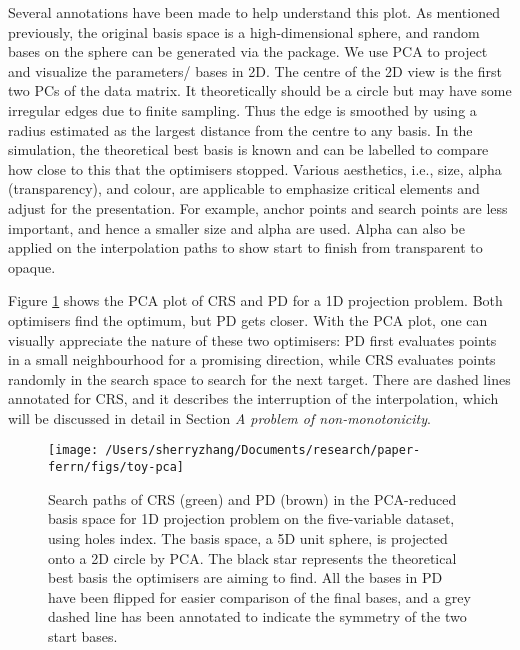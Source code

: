 Several annotations have been made to help understand this plot. As
mentioned previously, the original basis space is a high-dimensional
sphere, and random bases on the sphere can be generated via the
 \citep{geozoo} package. We use PCA to project and
visualize the parameters/ bases in 2D. The centre of the 2D view is the
first two PCs of the data matrix. It theoretically should be a circle
but may have some irregular edges due to finite sampling. Thus the edge
is smoothed by using a radius estimated as the largest distance from the
centre to any basis. In the simulation, the theoretical best basis is
known and can be labelled to compare how close to this that the
optimisers stopped. Various aesthetics, i.e., size, alpha
(transparency), and colour, are applicable to emphasize critical
elements and adjust for the presentation. For example, anchor points and
search points are less important, and hence a smaller size and alpha are
used. Alpha can also be applied on the interpolation paths to show start
to finish from transparent to opaque.

Figure \ref{fig:toy-pca} shows the PCA plot of CRS and PD for a 1D
projection problem. Both optimisers find the optimum, but PD gets
closer. With the PCA plot, one can visually appreciate the nature of
these two optimisers: PD first evaluates points in a small neighbourhood
for a promising direction, while CRS evaluates points randomly in the
search space to search for the next target. There are dashed lines
annotated for CRS, and it describes the interruption of the
interpolation, which will be discussed in detail in Section \emph{A
problem of non-monotonicity}.

\begin{Schunk}
\begin{figure}

{\centering \texttt{[image: /Users/sherryzhang/Documents/research/paper-ferrn/figs/toy-pca]} 

}

\caption[Search paths of CRS (green) and PD (brown) in the PCA-reduced basis space for 1D projection problem on the five-variable dataset,  using holes index]{Search paths of CRS (green) and PD (brown) in the PCA-reduced basis space for 1D projection problem on the five-variable dataset,  using holes index. The basis space, a 5D unit sphere, is projected onto a 2D circle by PCA. The black star represents the theoretical best basis the optimisers are aiming to find. All the bases in PD have been flipped for easier comparison of the final bases, and a grey dashed line has been annotated to indicate the symmetry of the two start bases.}\label{fig:toy-pca}
\end{figure}
\end{Schunk}

